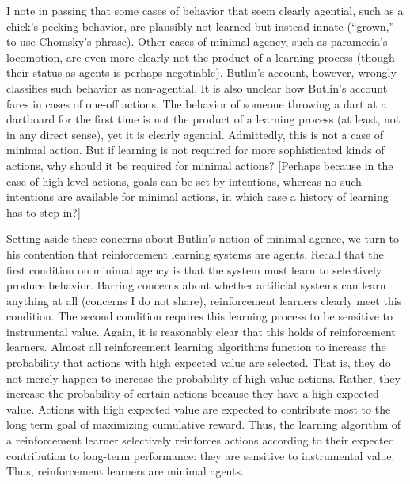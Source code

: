 I note in passing that some cases of behavior that seem clearly agential, such as a chick's pecking behavior, are plausibly not learned but instead innate (``grown,'' to use Chomsky's phrase).
Other cases of minimal agency, such as paramecia's locomotion, are even more clearly not the product of a learning process (though their status as agents is perhaps negotiable).
Butlin's account, however, wrongly classifies such behavior as non-agential.
It is also unclear how Butlin's account fares in cases of one-off actions.
The behavior of someone throwing a dart at a dartboard for the first time is not the product of a learning process (at least, not in any direct sense), yet it is clearly agential.
Admittedly, this is not a case of minimal action.
But if learning is not required for more sophisticated kinds of actions, why should it be required for minimal actions?
[Perhaps because in the case of high-level actions, goals can be set by intentions, whereas no such intentions are available for minimal actions, in which case a history of learning has to step in?]

Setting aside these concerns about Butlin's notion of minimal agence, we turn to his contention that reinforcement learning systems are agents.
Recall that the first condition on minimal agency is that the system must learn to selectively produce behavior.
Barring concerns about whether artificial systems can learn anything at all (concerns I do not share), reinforcement learners clearly meet this condition.
The second condition requires this learning process to be sensitive to instrumental value.
Again, it is reasonably clear that this holds of reinforcement learners.
Almost all reinforcement learning algorithms function to increase the probability that actions with high expected value are selected.
That is, they do not merely happen to increase the probability of high-value actions.
Rather, they increase the probability of certain actions because they have a high expected value.
Actions with high expected value are expected to contribute most to the long term goal of maximizing cumulative reward.
Thus, the learning algorithm of a reinforcement learner selectively reinforces actions according to their expected contribution to long-term performance: they are sensitive to instrumental value.
Thus, reinforcement learners are minimal agents.

